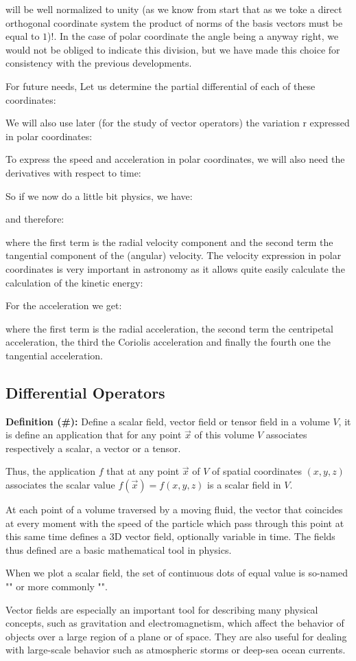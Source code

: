 	will be well normalized to unity (as we know from start that as we toke a direct orthogonal coordinate system the product of norms of the basis vectors must be equal to $1$)!. In the case of polar coordinate the angle being a anyway right, we would not be obliged to indicate this division, but we have made this choice for consistency with the previous developments.
	
	For future needs, Let us determine the partial differential of each of these coordinates:
	
	We will also use later (for the study of vector operators) the variation $\mathrm{r}$ expressed in polar coordinates:
	
	To express the speed and acceleration in polar coordinates, we will also need the derivatives with respect to time:
	
	So if we now do a little bit physics, we have:
	
	and therefore:
	
	where the first term is the radial velocity component and the second term the tangential component of the (angular) velocity. The velocity expression in polar coordinates is very important in astronomy as it allows quite easily calculate the calculation of the kinetic energy:
	
	For the acceleration we get:	
	
	where the first term is the radial acceleration, the second term the centripetal acceleration, the third the Coriolis acceleration and finally the fourth one the tangential acceleration.
	
	\pagebreak
	\subsection{Differential Operators}
	\textbf{Definition (\#\mydef):} Define a scalar field, vector field or tensor field in a volume $V$, it is define an application that for any point $\vec{x}$ of this volume $V$ associates respectively a scalar, a vector or a tensor.
	
	Thus, the application $f$ that at any point $\vec{x}$ of $V$ of spatial coordinates $(x, y, z)$ associates the scalar value $f(\vec{x})=f(x,y,z)$ is a scalar field in $V$.
	
	At each point of a volume traversed by a moving fluid, the vector that coincides at every moment with the speed of the particle which pass through this point at this same time defines a 3D vector field, optionally variable in time. The fields thus defined are a basic mathematical tool in physics.
	\begin{tcolorbox}[title=Remark,colframe=black,arc=10pt]
	When we plot a scalar field, the set of continuous dots of equal value is so-named "" or more commonly "".
	\end{tcolorbox}
	Vector fields are especially an important tool for describing many physical concepts, such as gravitation and electromagnetism, which affect the behavior of objects over a large region of a plane or of space. They are also useful for dealing with large-scale behavior such as atmospheric storms or deep-sea ocean currents.

